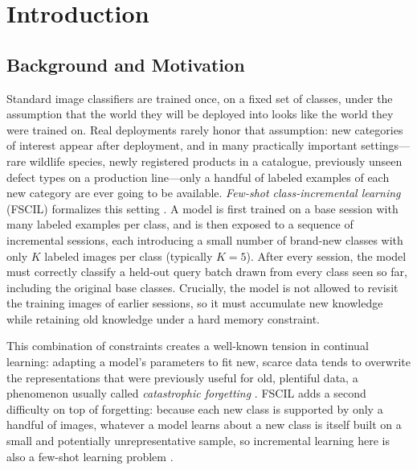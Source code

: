 \documentclass{iutbscthesis}
\begin{document}

\chapter{Introduction}
\label{chapter:introduction}

\section{Background and Motivation}

Standard image classifiers are trained once, on a fixed set of classes, under the assumption that the world they will be deployed into looks like the world they were trained on. Real deployments rarely honor that assumption: new categories of interest appear after deployment, and in many practically important settings---rare wildlife species, newly registered products in a catalogue, previously unseen defect types on a production line---only a handful of labeled examples of each new category are ever going to be available. \emph{Few-shot class-incremental learning} (FSCIL) formalizes this setting \autocite{tao2020fewshot}. A model is first trained on a base session with many labeled examples per class, and is then exposed to a sequence of incremental sessions, each introducing a small number of brand-new classes with only $K$ labeled images per class (typically $K=5$). After every session, the model must correctly classify a held-out query batch drawn from every class seen so far, including the original base classes. Crucially, the model is not allowed to revisit the training images of earlier sessions, so it must accumulate new knowledge while retaining old knowledge under a hard memory constraint.

This combination of constraints creates a well-known tension in continual learning: adapting a model's parameters to fit new, scarce data tends to overwrite the representations that were previously useful for old, plentiful data, a phenomenon usually called \emph{catastrophic forgetting} \autocite{parisi2019continual, delange2021continual}. FSCIL adds a second difficulty on top of forgetting: because each new class is supported by only a handful of images, whatever a model learns about a new class is itself built on a small and potentially unrepresentative sample, so incremental learning here is also a few-shot learning problem \autocite{chen2019closer, snell2017prototypical, vinyals2016matching, finn2017modelagnostic}.
\end{document}

